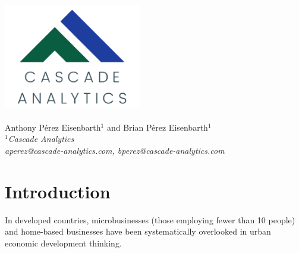 \documentclass[12pt, titlepage]{article}
\date{}
\numberwithin{equation}{section}
\begin{document}
	\begin{titlepage}
		\centering
		\includegraphics[width =6cm]{company.png}\\
		\LARGE{}\\
		\vspace{5mm}
		\normalsize{Anthony P\'erez Eisenbarth\(^1\) and Brian P\'erez Eisenbarth\(^1\)}\\
		\vspace{5mm}
		\textit{
			\(^1\)Cascade Analytics\\
			\vspace{1mm}
			aperez@cascade-analytics.com, bperez@cascade-analytics.com
		}
	\end{titlepage}
	\tableofcontents 
	\cleardoublepage
	\section{Introduction}
	\normalsize
In developed countries, microbusinesses (those employing fewer than 10 people) and home-based businesses have been systematically overlooked in urban economic development thinking. 
\end{document}
